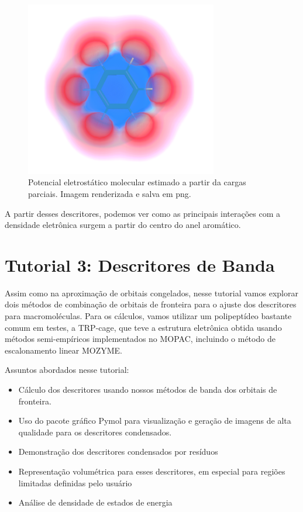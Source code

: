 \documentclass[a4paper,11pt]{refart}
\begin{document}
\hspace*{-\leftmarginwidth}
\begin{minipage}{\fullwidth}
	\begin{figure}[H]
		\begin{center}
			\includegraphics[width=3.3in]{images/tut2_img12}
			\caption{Potencial eletrostático molecular estimado a partir da cargas parciais. Imagem renderizada e salva em png.}
			\label{fig_tut2_11}
		\end{center}
	\end{figure}
\end{minipage}

A partir desses descritores, podemos ver como as principais interações com a densidade eletrônica surgem a partir do centro do anel aromático. 

\newpage
\section{Tutorial 3: Descritores de Banda}

Assim como na aproximação de orbitais congelados, nesse tutorial vamos explorar dois métodos de combinação de orbitais de fronteira para o ajuste dos descritores para macromoléculas. Para os cálculos, vamos utilizar um polipeptídeo bastante comum em testes, a TRP-cage, que teve a estrutura eletrônica obtida usando métodos semi-empíricos implementados no MOPAC, incluindo o método de escalonamento linear MOZYME.

Assuntos abordados nesse tutorial:

\begin{itemize}
	\item Cálculo dos descritores usando nossos métodos de banda dos orbitais de fronteira.
	\item Uso do pacote gráfico Pymol para visualização e geração de imagens de alta qualidade para os descritores condensados. 
	\item Demonstração dos descritores condensados por resíduos
	\item Representação volumétrica para esses descritores, em especial para regiões limitadas definidas pelo usuário
	\item Análise de densidade de estados de energia
\end{itemize}
\end{document}
